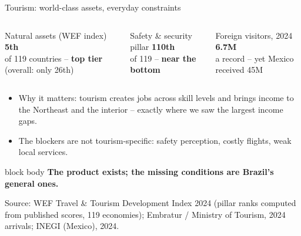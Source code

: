 \documentclass[10pt,aspectratio=169]{beamer}
\newcommand{\source}[1]{%
  \par\vfill{\tiny\color{MidGray}Source: #1}}
\newcommand{\key}[1]{\textcolor{BrazilGreen}{\textbf{#1}}}
\newcommand{\warn}[1]{\textcolor{Brick}{\textbf{#1}}}
\newcommand{\muted}[1]{\textcolor{MidGray}{#1}}
\newcommand{\question}[1]{%
  \begin{beamercolorbox}[rounded=true,sep=0.55em,wd=\textwidth]{block body}
    \centering\large\textbf{#1}
  \end{beamercolorbox}}
\begin{document}
\begin{frame}{Tourism: world-class assets, everyday constraints}
  \begin{columns}[T,onlytextwidth]
      \begin{block}{Natural assets (WEF index)}
        \centering
        {\fontsize{28}{32}\selectfont\color{DeepNavy}\textbf{5th}}\\
        of 119 countries -- \key{top tier} \muted{(overall: only 26th)}
      \end{block}
      \begin{block}{Safety \& security pillar}
        \centering
        {\fontsize{28}{32}\selectfont\color{DeepNavy}\textbf{110th}}\\
        of 119 -- \warn{near the bottom}
      \end{block}
      \begin{block}{Foreign visitors, 2024}
        \centering
        {\fontsize{28}{32}\selectfont\color{DeepNavy}\textbf{6.7M}}\\
        a record -- yet \muted{Mexico received 45M}
      \end{block}
  \end{columns}
  \smallskip
  \begin{itemize}
    \item Why it matters: tourism creates jobs across skill levels and brings income to the Northeast and the interior -- exactly where we saw the largest income gaps.
    \item The blockers are not tourism-specific: safety perception, costly flights, weak local services.
  \end{itemize}
  \question{The product exists; the missing conditions are Brazil's general ones.}
  \source{WEF Travel \& Tourism Development Index 2024 (pillar ranks computed from published scores, 119 economies); Embratur / Ministry of Tourism, 2024 arrivals; INEGI (Mexico), 2024.}
\end{frame}
\end{document}
